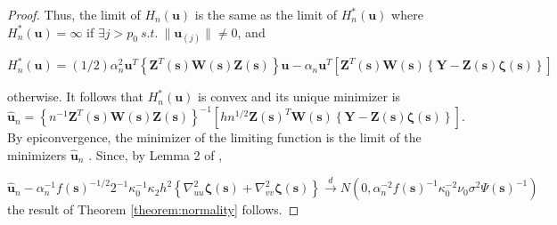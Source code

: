 \documentclass[authoryear,review, 12pt]{elsarticle}
\begin{document}
\begin{proof}
Thus, the limit of $H_{n}\left(\bm{u}\right)$ is the same as the
limit of $H_{n}^{*}\left(\bm{u}\right)$ where $H_{n}^{*}\left(\bm{u}\right)=\infty$
if $\exists j>p_{0}\ s.t.\ \|\bm{u}_{\left(j\right)}\|\ne0$, and 

\[
H_{n}^{*}\left(\bm{u}\right)=(1/2)\alpha_{n}^{2}\bm{u}^{T}\left\{ \bm{Z}^{T}(\bm{s})\bm{W}(\bm{s})\bm{Z}(\bm{s})\right\} \bm{u}-\alpha_{n}\bm{u}^{T}\left[\bm{Z}^{T}(\bm{s})\bm{W}(\bm{s})\left\{ \bm{Y}-\bm{Z}(\bm{s})\bm{\zeta}(\bm{s})\right\} \right]
\]


otherwise. It follows that $H_{n}^{*}\left(\bm{u}\right)$ is convex
and its unique minimizer is 
\[
\hat{\bm{u}}_{n}=\left\{ n^{-1}\bm{Z}^{T}\left(\bm{s}\right)\bm{W}\left(\bm{s}\right)\bm{Z}\left(\bm{s}\right)\right\} ^{-1}\left[hn^{1/2}\bm{Z}\left(\bm{s}\right)^{T}\bm{W}\left(\bm{s}\right)\left\{ \bm{Y}-\bm{Z}\left(\bm{s}\right)\bm{\zeta}\left(\bm{s}\right)\right\} \right].
\]
By epiconvergence, the minimizer of the limiting function is the limit
of the minimizers $\hat{\bm{u}}_{n}$ \citep{Geyer-1994,Knight-Fu-2000}.
Since, by Lemma 2 of \citet{Sun-Yan-Zhang-Lu-2014},

\[
\hat{\bm{u}}_{n}-\alpha_{n}^{-1}f\left(\bm{s}\right)^{-1/2}2^{-1}\kappa_{0}^{-1}\kappa_{2}h^{2}\left\{ \nabla_{uu}^{2}\bm{\zeta}(\bm{s})+\nabla_{vv}^{2}\bm{\zeta}(\bm{s})\right\} \xrightarrow{d}N\left(0,\alpha_{n}^{-2}f\left(\bm{s}\right)^{-1}\kappa_{0}^{-2}\nu_{0}\sigma^{2}\Psi\left(\bm{s}\right)^{-1}\right)
\]
the result of Theorem \ref{theorem:normality} follows.
\end{proof}
\end{document}
